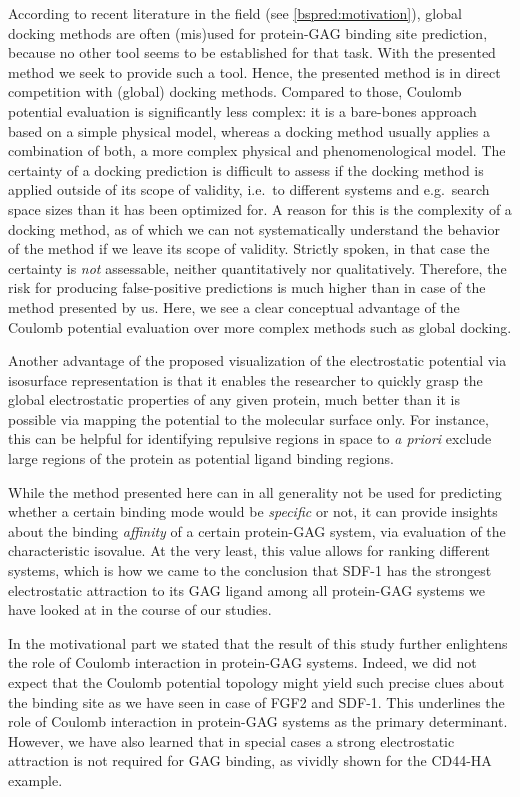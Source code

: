 According to recent literature in the field (see \cref{bspred:motivation}),
global docking methods are often (mis)used for protein-GAG binding site
prediction, because no other tool seems to be established for that task. With
the presented method we seek to provide such a tool. Hence, the presented method
is in direct competition with (global) docking methods. Compared to those,
Coulomb potential evaluation is significantly less complex: it is a bare-bones
approach based on a simple physical model, whereas a docking method usually
applies a combination of both, a more complex physical and phenomenological
model. The certainty of a docking prediction is difficult to assess if the
docking method is applied outside of its scope of validity, i.e.\ to different
systems and e.g.\ search space sizes than it has been optimized for. A reason
for this is the complexity of a docking method, as of which we can not
systematically understand the behavior of the method if we leave its scope of
validity. Strictly spoken, in that case the certainty is \textit{not}
assessable, neither quantitatively nor qualitatively. Therefore, the risk for
producing false-positive predictions is much higher than in case of the method
presented by us. Here, we see a clear conceptual advantage of the Coulomb
potential evaluation over more complex methods such as global docking.

Another advantage of the proposed visualization of the electrostatic potential
via isosurface representation is that it enables the researcher to quickly grasp
the global electrostatic properties of any given protein, much better than it is
possible via mapping the potential to the molecular surface only. For instance,
this can be helpful for identifying repulsive regions in space to \textit{a
priori} exclude large regions of the protein as potential ligand binding
regions.

While the method presented here can in all generality not be used for predicting
whether a certain binding mode would be \textit{specific} or not, it can provide
insights about the binding \textit{affinity} of a certain protein-GAG system,
via evaluation of the characteristic isovalue. At the very least, this value
allows for ranking different systems, which is how we came to the conclusion
that SDF-1 has the strongest electrostatic attraction to its GAG ligand among
all protein-GAG systems we have looked at in the course of our studies.

In the motivational part we stated that the result of this study further
enlightens the role of Coulomb interaction in protein-GAG systems. Indeed, we
did not expect that the Coulomb potential topology might yield such precise
clues about the binding site as we have seen in case of FGF2 and SDF-1. This
underlines the role of Coulomb interaction in protein-GAG systems as the primary
determinant. However, we have also learned that in special cases a strong
electrostatic attraction is not required for GAG binding, as vividly shown for
the CD44-HA example.

